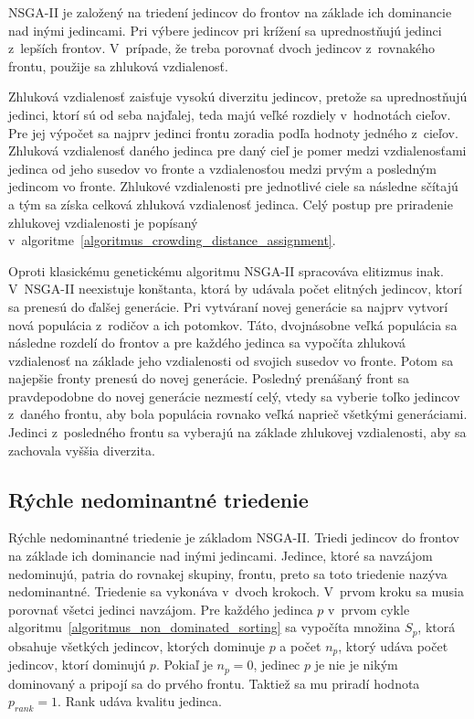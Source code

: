 NSGA-II je založený na triedení jedincov do frontov na základe ich dominancie nad inými jedincami.
Pri výbere jedincov pri krížení sa uprednostňujú jedinci z~lepších frontov.
V~prípade, že treba porovnať dvoch jedincov z~rovnakého frontu, použije sa zhluková vzdialenosť.

Zhluková vzdialenosť zaisťuje vysokú diverzitu jedincov, pretože sa uprednostňujú jedinci, ktorí sú od seba najďalej, teda majú veľké rozdiely v~hodnotách cieľov.
Pre jej výpočet sa najprv jedinci frontu zoradia podľa hodnoty jedného z~cieľov.
Zhluková vzdialenosť daného jedinca pre daný cieľ je pomer medzi vzdialenosťami jedinca od jeho susedov vo fronte a vzdialenosťou medzi prvým a posledným jedincom vo fronte.
Zhlukové vzdialenosti pre jednotlivé ciele sa následne sčítajú a tým sa získa celková zhluková vzdialenosť jedinca.
Celý postup pre priradenie zhlukovej vzdialenosti je popísaný v~algoritme~\ref{algoritmus_crowding_distance_assignment}.

Oproti klasickému genetickému algoritmu NSGA-II spracováva elitizmus inak.
V~NSGA-II neexistuje konštanta, ktorá by udávala počet elitných jedincov, ktorí sa prenesú do ďalšej generácie.
Pri vytváraní novej generácie sa najprv vytvorí nová populácia z~rodičov a ich potomkov.
Táto, dvojnásobne veľká populácia sa následne rozdelí do frontov a pre každého jedinca sa vypočíta zhluková vzdialenosť na základe jeho vzdialenosti od svojich susedov vo fronte.
Potom sa najepšie fronty prenesú do novej generácie.
Posledný prenášaný front sa pravdepodobne do novej generácie nezmestí celý, vtedy sa vyberie toľko jedincov z~daného frontu, aby bola populácia rovnako veľká naprieč všetkými generáciami.
Jedinci z~posledného frontu sa vyberajú na základe zhlukovej vzdialenosti, aby sa zachovala vyššia diverzita.

\subsection*{Rýchle nedominantné triedenie}
Rýchle nedominantné triedenie je základom NSGA-II.
Triedi jedincov do frontov na základe ich dominancie nad inými jedincami.
Jedince, ktoré sa navzájom nedominujú, patria do rovnakej skupiny, frontu, preto sa toto triedenie nazýva nedominantné.
Triedenie sa vykonáva v~dvoch krokoch.
V~prvom kroku sa musia porovnať všetci jedinci navzájom.
Pre každého jedinca $p$ v~prvom cykle algoritmu~\ref{algoritmus_non_dominated_sorting} sa vypočíta množina $S_p$, ktorá obsahuje všetkých jedincov, ktorých dominuje $p$ a počet $n_p$, ktorý udáva počet jedincov, ktorí dominujú $p$.
Pokiaľ je $n_p = 0$, jedinec $p$ je nie je nikým dominovaný a pripojí sa do prvého frontu.
Taktiež sa mu priradí hodnota $p_{rank} = 1$.
Rank udáva kvalitu jedinca.

